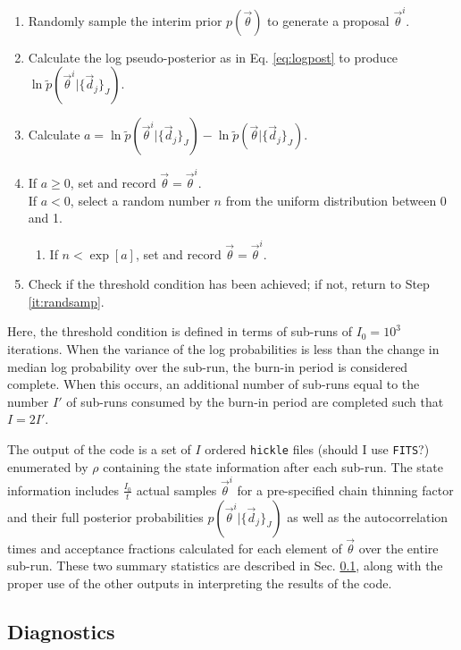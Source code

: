 \documentclass[preprint]{aastex}
\begin{document}
\begin{enumerate}
\item \label{it:randsamp} Randomly sample the interim prior $p(\vec{\theta})$ to generate a proposal $\vec{\theta}^{i}$.
\item Calculate the log pseudo-posterior as in Eq. \ref{eq:logpost} to produce $\ln\tilde{p}(\vec{\theta}^{i}|\{\vec{d}_{j}\}_{J})$.
\item Calculate $a=\ln\tilde{p}(\vec{\theta}^{i}|\{\vec{d}_{j}\}_{J})-\ln\tilde{p}(\vec{\theta}|\{\vec{d}_{j}\}_{J})$.
\item If $a\geq0$, set and record $\vec{\theta}=\vec{\theta}^{i}$.\\
If $a<0$, select a random number $n$ from the uniform distribution between 0 and 1.
\begin{enumerate}
\item If $n<\exp[a]$, set and record $\vec{\theta}=\vec{\theta}^{i}$.
\end{enumerate}
\item Check if the threshold condition has been achieved; if not, return to Step \ref{it:randsamp}.
\end{enumerate}

Here, the threshold condition is defined in terms of sub-runs of $I_{0}=10^{3}$ iterations.  When the variance of the log probabilities is less than the change in median log probability over the sub-run, the burn-in period is considered complete.  When this occurs, an additional number of sub-runs equal to the number $I'$ of sub-runs consumed by the burn-in period are completed such that $I=2I'$.  

The output of the code is a set of $I$ ordered \texttt{hickle} files (should I use \texttt{FITS}?) enumerated by $\rho$ containing the state information after each sub-run.  The state information includes $\frac{I_{0}}{t}$ actual samples $\vec{\theta}^{i}$ for a pre-specified chain thinning factor and their full posterior probabilities $p(\vec{\theta}^{i}|\{\vec{d}_{j}\}_{J})$ as well as the autocorrelation times and acceptance fractions calculated for each element of $\vec{\theta}$ over the entire sub-run.  These two summary statistics are described in Sec. \ref{sec:diag}, along with the proper use of the other outputs in interpreting the results of the code.

\clearpage
\subsection{Diagnostics}
\label{sec:diag}
\end{document}
